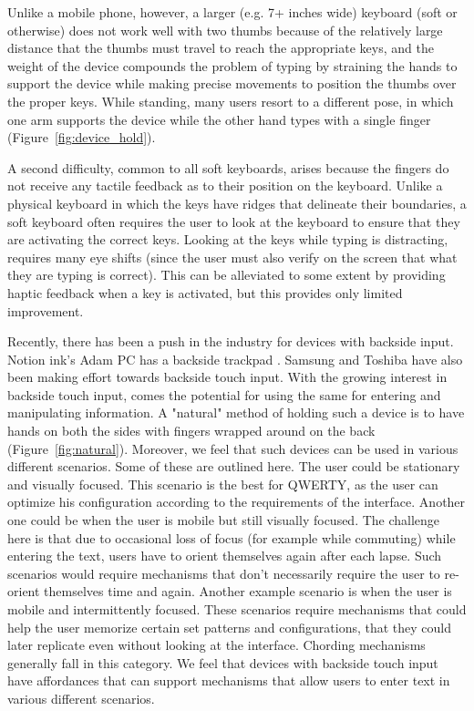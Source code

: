 Unlike a mobile phone, however, a larger (e.g. 7+ inches wide)
keyboard (soft or otherwise) does not work well with two thumbs
because of the relatively large distance that the thumbs must travel
to reach the appropriate keys, and the weight of the device compounds
the problem of typing by straining the hands to support the device
while making precise movements to position the thumbs over the proper
keys. While standing, many users resort to a different pose, in which
one arm supports the device while the other hand types with a single
finger (Figure~\ref{fig:device_hold}).

A second difficulty, common to all soft keyboards, arises because the
fingers do not receive any tactile feedback as to their position on
the keyboard.  Unlike a physical keyboard in which the keys have
ridges that delineate their boundaries, a soft keyboard often requires
the user to look at the keyboard to ensure that they are activating
the correct keys.  Looking at the keys while typing is distracting,
requires many eye shifts (since the user must also verify on the
screen that what they are typing is correct).  This can be alleviated
to some extent by providing haptic feedback when a key is activated,
but this provides only limited improvement.

Recently, there has been a push in the industry for devices with
backside input. Notion ink's Adam PC has a backside trackpad
\cite{1}. Samsung and Toshiba have also been making effort towards
backside touch input. With the growing interest in backside touch
input, comes the potential for using the same for entering and
manipulating information. A "natural" method of holding such a device
is to have hands on both the sides with fingers wrapped around on the
back (Figure~\ref{fig:natural}). Moreover, we feel that such devices can be used in various different scenarios. Some of these are outlined here. The user could be stationary and visually focused. This scenario is the best for QWERTY, as the user can optimize his configuration according to the requirements of the interface. Another one could be when the user is mobile but still visually focused. The challenge here is
that due to occasional loss of focus (for example while commuting) while entering the text, users
have to orient themselves again after each lapse. Such scenarios would
require mechanisms that don't necessarily require the user to
re-orient themselves time and again. Another example scenario is when the user is mobile and intermittently focused. These scenarios require mechanisms that could help the user memorize certain set patterns and configurations, that they could later replicate even without looking at the interface. Chording mechanisms generally fall in this category. We feel that devices with backside touch input have affordances that can support mechanisms that allow users to enter text in various different scenarios.

